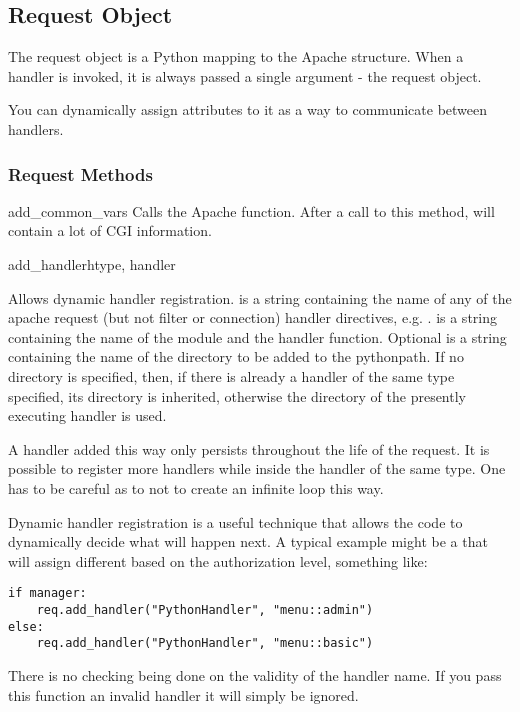 \subsection{Request Object\label{pyapi-mprequest}}

The request object is a Python mapping to the Apache
 structure. When a handler is invoked, it is always
passed a single argument - the request object. 

You can dynamically assign attributes to it as a way to communicate
between handlers.

\subsubsection{Request Methods\label{pyapi-mprequest-meth}}

\begin{methoddesc}[request]{add_common_vars}{}
  Calls the Apache  function. After a
  call to this method,  will contain a
  lot of CGI information.
\end{methoddesc}

\begin{methoddesc}[request]{add_handler}{htype, handler}

  Allows dynamic handler registration.  is a string
  containing the name of any of the apache request (but not filter or
  connection) handler directives,
  e.g. .  is a string containing the
  name of the module and the handler function.  Optional  is
  a string containing the name of the directory to be added to the
  pythonpath. If no directory is specified, then, if there is already
  a handler of the same type specified, its directory is inherited,
  otherwise the directory of the presently executing handler is used.
  
  A handler added this way only persists throughout the life of the
  request. It is possible to register more handlers while inside the
  handler of the same type. One has to be careful as to not to create
  an infinite loop this way.

  Dynamic handler registration is a useful technique that allows the
  code to dynamically decide what will happen next. A typical example
  might be a  that will assign different
   based on the authorization level, something
  like:

  \begin{verbatim}
if manager:
    req.add_handler("PythonHandler", "menu::admin")
else:
    req.add_handler("PythonHandler", "menu::basic")
  \end{verbatim}                              

  \begin{notice}
    There is no checking being done on the validity of the handler
    name. If you pass this function an invalid handler it will simply be
    ignored.
  \end{notice}
\end{methoddesc}

